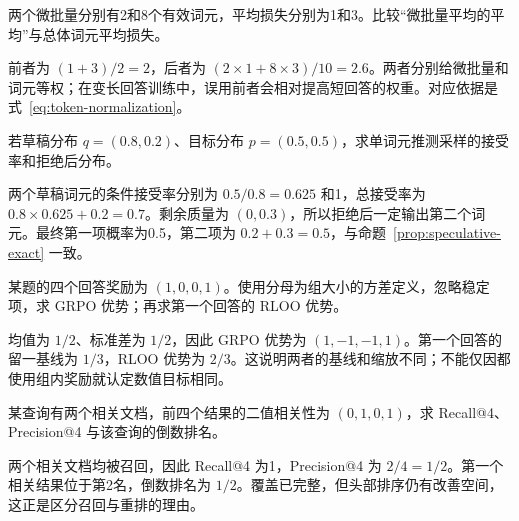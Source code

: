 \begin{example}
\label{ex:unequal-microbatches}
两个微批量分别有2和8个有效词元，平均损失分别为1和3。比较“微批量平均的平均”与总体词元平均损失。
\end{example}
\begin{solve}
前者为 $(1+3)/2=2$，后者为 $(2\times1+8\times3)/10=2.6$。两者分别给微批量和词元等权；在变长回答训练中，误用前者会相对提高短回答的权重。对应依据是式~\eqref{eq:token-normalization}。
\end{solve}

\begin{example}
若草稿分布 $q=(0.8,0.2)$、目标分布 $p=(0.5,0.5)$，求单词元推测采样的接受率和拒绝后分布。
\end{example}
\begin{solve}
两个草稿词元的条件接受率分别为 $0.5/0.8=0.625$ 和1，总接受率为 $0.8\times0.625+0.2=0.7$。剩余质量为 $(0,0.3)$，所以拒绝后一定输出第二个词元。最终第一项概率为0.5，第二项为 $0.2+0.3=0.5$，与命题~\ref{prop:speculative-exact} 一致。
\end{solve}

\begin{example}
某题的四个回答奖励为 $(1,0,0,1)$。使用分母为组大小的方差定义，忽略稳定项，求 GRPO 优势；再求第一个回答的 RLOO 优势。
\end{example}
\begin{solve}
均值为 $1/2$、标准差为 $1/2$，因此 GRPO 优势为 $(1,-1,-1,1)$。第一个回答的留一基线为 $1/3$，RLOO 优势为 $2/3$。这说明两者的基线和缩放不同；不能仅因都使用组内奖励就认定数值目标相同。
\end{solve}

\begin{example}
某查询有两个相关文档，前四个结果的二值相关性为 $(0,1,0,1)$，求 Recall@4、Precision@4 与该查询的倒数排名。
\end{example}
\begin{solve}
两个相关文档均被召回，因此 Recall@4 为1，Precision@4 为 $2/4=1/2$。第一个相关结果位于第2名，倒数排名为 $1/2$。覆盖已完整，但头部排序仍有改善空间，这正是区分召回与重排的理由。
\end{solve}

